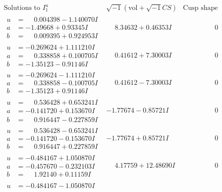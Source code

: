 \documentclass[1p]{elsarticle_modified}
\theoremstyle{definition}
\newcommand{\I}{\sqrt{-1}}
\begin{document}
$$\begin{array}{c|c|c}
\text{Solutions to }I^u_{1}& \I (\text{vol} + \sqrt{-1}CS) & \text{Cusp shape}\\
 \hline 
\begin{aligned}
u &= \phantom{-}0.004398 - 1.140070 I \\
a &= -1.49668 + 0.93345 I \\
b &= \phantom{-}0.009395 + 0.924953 I\end{aligned}
 & \phantom{-}8.34632 + 0.46353 I & \phantom{-0.000000 } 0 \\ \hline\begin{aligned}
u &= -0.269624 + 1.111210 I \\
a &= \phantom{-}0.338858 + 0.100705 I \\
b &= -1.35123 - 0.91146 I\end{aligned}
 & \phantom{-}0.41612 + 7.30003 I & \phantom{-0.000000 } 0 \\ \hline\begin{aligned}
u &= -0.269624 - 1.111210 I \\
a &= \phantom{-}0.338858 - 0.100705 I \\
b &= -1.35123 + 0.91146 I\end{aligned}
 & \phantom{-}0.41612 - 7.30003 I & \phantom{-0.000000 } 0 \\ \hline\begin{aligned}
u &= \phantom{-}0.536428 + 0.653241 I \\
a &= -0.141720 + 0.153670 I \\
b &= \phantom{-}0.916447 - 0.227859 I\end{aligned}
 & -1.77674 - 0.85721 I & \phantom{-0.000000 } 0 \\ \hline\begin{aligned}
u &= \phantom{-}0.536428 - 0.653241 I \\
a &= -0.141720 - 0.153670 I \\
b &= \phantom{-}0.916447 + 0.227859 I\end{aligned}
 & -1.77674 + 0.85721 I & \phantom{-0.000000 } 0 \\ \hline\begin{aligned}
u &= -0.484167 + 1.050870 I \\
a &= -0.457670 - 0.232103 I \\
b &= \phantom{-}1.92140 + 0.11159 I\end{aligned}
 & \phantom{-}4.17759 + 12.48690 I & \phantom{-0.000000 } 0 \\ \hline\begin{aligned}
u &= -0.484167 - 1.050870 I \\

\end{aligned}
\end{array}$$
\end{document}
